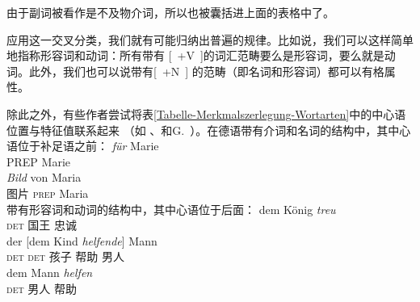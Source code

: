 \noindent
由于副词被看作是不及物介词\label{Seite-Adverbien-PP}，所以也被囊括进上面的表格中了。

应用这一交叉分类，我们就有可能归纳出普遍的规律。比如说，我们可以这样简单地指称形容词和动词：所有带有 [~+V~]的词汇范畴要么是形容词，要么就是动词。此外，我们也可以说带有[~+N~] 的范畴（即名词和形容词）都可以有格属性。

除此之外，有些作者尝试将表\ref{Tabelle-Merkmalszerlegung-Wortarten}中的中心语位置与特征值联系起来
（如 \citealp[]{Grewendorf88a}、\citealp[]{Haftka96a}和G.\ \citealp[]{GMueller2011a}）。在德语带有介词和名词的结构中，其中心语位于补足语之前：
\eal
\ex
\gll \emph{für} Marie\\
	 PREP Marie\\
\ex 
\gll \emph{Bild} von Maria\\
	 图片 \textsc{prep} Maria\\
\zl
带有形容词和动词的结构中，其中心语位于后面：
\eal
\ex 
\gll dem König \emph{treu}\\
     \textsc{det} 国王 忠诚\\
\ex 
\gll der [dem Kind \emph{helfende}] Mann\\
     \textsc{det} \spacebr\textsc{det} 孩子 帮助 男人\\
\ex 
\gll dem Mann \emph{helfen}\\
      \textsc{det} 男人 帮助\\
